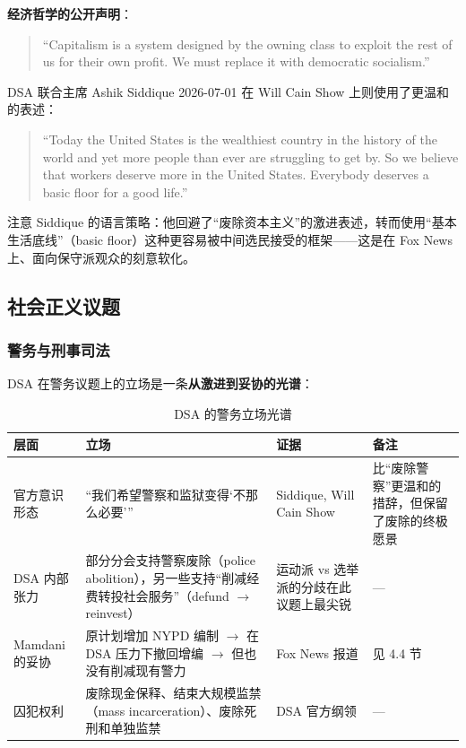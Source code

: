 \documentclass[12pt,a4paper]{ctexart}
\begin{document}
\textbf{经济哲学的公开声明}：

\begin{quote}
``Capitalism is a system designed by the owning class to exploit the rest of us for their own profit. We must replace it with democratic socialism.''
\end{quote}

DSA 联合主席 Ashik Siddique 2026-07-01 在 Will Cain Show 上则使用了更温和的表述：

\begin{quote}
``Today the United States is the wealthiest country in the history of the world and yet more people than ever are struggling to get by. So we believe that workers deserve more in the United States. Everybody deserves a basic floor for a good life.''
\end{quote}

注意 Siddique 的语言策略：他回避了``废除资本主义''的激进表述，转而使用``基本生活底线''（basic floor）这种更容易被中间选民接受的框架——这是在 Fox News 上、面向保守派观众的刻意软化。

\subsection{社会正义议题}

\subsubsection{警务与刑事司法}

DSA 在警务议题上的立场是一条\textbf{从激进到妥协的光谱}：

\begin{table}[h]
\centering
\caption{DSA 的警务立场光谱}
\begin{tabular}{@{}lp{3.2cm}p{4.4cm}p{5.4cm}@{}}
\toprule
\textbf{层面} & \textbf{立场} & \textbf{证据} & \textbf{备注} \\
\midrule
官方意识形态 & ``我们希望警察和监狱变得`不那么必要''' & Siddique, Will Cain Show & 比``废除警察''更温和的措辞，但保留了废除的终极愿景 \\
DSA 内部张力 & 部分分会支持警察废除（police abolition），另一些支持``削减经费转投社会服务''（defund $\rightarrow$ reinvest） & 运动派 vs 选举派的分歧在此议题上最尖锐 & --- \\
Mamdani 的妥协 & 原计划增加 NYPD 编制 $\rightarrow$ 在 DSA 压力下撤回增编 $\rightarrow$ 但也没有削减现有警力 & Fox News 报道 & 见 4.4 节 \\
囚犯权利 & 废除现金保释、结束大规模监禁（mass incarceration）、废除死刑和单独监禁 & DSA 官方纲领 & --- \\
\bottomrule
\end{tabular}
\end{table}
\end{document}
